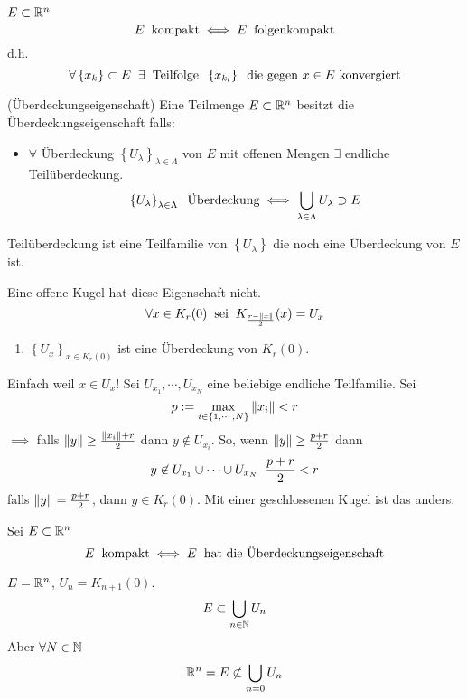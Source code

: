 \begin{Sat}
  $E\subset \mathbb{R}^n$
  \[E\hspace{2mm}\text{kompakt}\iff E\hspace{2mm}\text{folgenkompakt}\]
  d.h.
  \[\forall \left\{ x_k \right\} \subset E\hspace{2mm}\exists\hspace{2mm}\text{Teilfolge}\hspace{2mm} \left\{ x_{k_l} \right\}\hspace{2mm}\text{die gegen $x\in E$ konvergiert}\]
\end{Sat}
\begin{Def}
  (Überdeckungseigenschaft) Eine Teilmenge $E\subset\mathbb{R}^n$ besitzt die Überdeckungseigenschaft falls:
  \begin{itemize}
    \item $\forall$ Überdeckung $\left\{ U_\lambda \right\}_{\lambda\in\Lambda}$ von $E$ mit offenen Mengen $\exists$ endliche Teilüberdeckung.
      \[\left\{ U_\lambda \right\}_{\lambda\in\Lambda}\hspace{2mm}\text{Überdeckung}\iff \bigcup_{\lambda\in\Lambda} U_\lambda\supset E\]
  \end{itemize}
  Teilüberdeckung ist eine Teilfamilie von $\left\{ U_\lambda \right\}$ die noch eine Überdeckung von $E$ ist.
\end{Def}
\begin{Bsp}
  Eine offene Kugel hat diese Eigenschaft nicht.
  \[\forall x\in K_r(0)\hspace{2mm}\text{sei}\hspace{2mm} K_{\frac{r-\left\| x \right\|}{2}}(x)=U_x\]
  \begin{enumerate}
    \item $\left\{ U_x \right\}_{x\in K_r(0)}$ ist eine Überdeckung von $K_r(0)$.
  \end{enumerate}
  Einfach weil $x\in U_x$! Sei $U_{x_1},\cdots,U_{x_N}$ eine beliebige endliche Teilfamilie. Sei 
  \[p:=\max_{i\in\left\{ 1,\cdots,N \right\}}\left\| x_i \right\|<r\]
  $\implies$ falls $\left\| y \right\|\geq \frac{\left\| x_i \right\|+r}{2}$ dann $y\not\in U_{x_i}$. So, wenn $\left\| y \right\|\geq \frac{p+r}{2}$ dann
  \[y\not\in U_{x_1}\cup\cdots\cup U_{x_N}\hspace{2mm}\frac{p+r}{2}<r\]
  falls $\left\| y \right\|=\frac{p+r}{2}$, dann $y\in K_r(0)$. Mit einer geschlossenen Kugel ist das anders.
\end{Bsp}
\begin{Sat}
  Sei $E\subset\mathbb{R}^n$
  \[E\hspace{2mm}\text{kompakt}\iff E\hspace{2mm}\text{hat die Überdeckungseigenschaft}\]
\end{Sat}
\begin{Bsp}
  $E=\mathbb{R}^n$, $U_n=K_{n+1}(0)$.
  \[E\subset \bigcup_{n\in\mathbb{N}} U_n\]
  Aber $\forall N\in\mathbb{N}$
  \[\mathbb{R}^n=E\not\subset \bigcup_{n=0} U_n\]
\end{Bsp}
